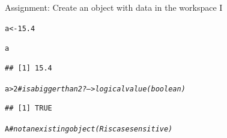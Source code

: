 \documentclass[xcolor=table,           xcolor=dvipsnames]{beamer}\usepackage[]{graphicx}\usepackage[]{color}
\makeatletter
\newcommand{\hlnum}[1]{\textcolor[rgb]{0,0,0}{#1}}
\newcommand{\hlcom}[1]{\textcolor[rgb]{0,0.392,0}{\textit{#1}}}
\newcommand{\hlopt}[1]{\textcolor[rgb]{0,0,0}{#1}}
\newcommand{\hlstd}[1]{\textcolor[rgb]{0,0,0}{#1}}
\newcommand{\hlkwb}[1]{\textcolor[rgb]{0,0,0}{#1}}
\newenvironment{kframe}{%
 \def\at@end@of@kframe{}%
 \ifinner\ifhmode%
  \def\at@end@of@kframe{\end{minipage}}%
  \begin{minipage}{\columnwidth}%
 \fi\fi%
 \def\FrameCommand##1{\hskip\@totalleftmargin \hskip-\fboxsep
 \colorbox{shadecolor}{##1}\hskip-\fboxsep
     \hskip-\linewidth \hskip-\@totalleftmargin \hskip\columnwidth}%
 \MakeFramed {\advance\hsize-\width
   \@totalleftmargin\z@ \linewidth\hsize
   \@setminipage}}%
 {\par\unskip\endMakeFramed%
 \at@end@of@kframe}
\newenvironment{knitrout}{}{} %
\makeatother
\begin{document}
\begin{frame}[fragile]{Assignment:  Create an object with data in the workspace I}
\begin{knitrout}
\color{fgcolor}\begin{kframe}
\begin{alltt}
\hlstd{a} \hlkwb{<-} \hlnum{15.4}
\end{alltt}
\end{kframe}
\end{knitrout}
\begin{knitrout}
\color{fgcolor}\begin{kframe}
\begin{alltt}
\hlstd{a}
\end{alltt}
\begin{verbatim}
## [1] 15.4
\end{verbatim}
\end{kframe}
\end{knitrout}
\begin{knitrout}
\color{fgcolor}\begin{kframe}
\begin{alltt}
\hlstd{a} \hlopt{>} \hlnum{2} \hlcom{# is a bigger than 2?  --> logical value (boolean)}
\end{alltt}
\begin{verbatim}
## [1] TRUE
\end{verbatim}
\end{kframe}
\end{knitrout}
\begin{knitrout}
\color{fgcolor}\begin{kframe}
\begin{alltt}
\hlstd{A} \hlcom{# not an existing object (R is case sensitive)}
\end{alltt}


{\ttfamily\noindent\bfseries\color{errorcolor}{\#\# Error in eval(expr, envir, enclos): object 'A' not found}}\end{kframe}
\end{knitrout}
\end{frame}

\end{document}
